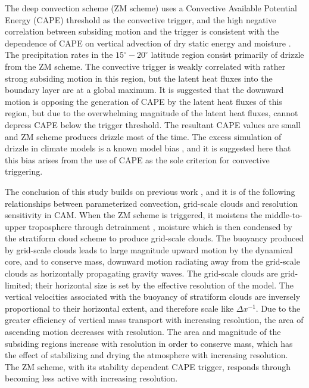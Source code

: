 The \cite{ZM1995AO} deep convection scheme (ZM scheme) uses a Convective Available Potential Energy (CAPE) threshold as the convective trigger, and the high negative correlation between subsiding motion and the trigger is consistent with the dependence of CAPE on vertical advection of dry static energy and moisture \citep{Z2002JGR}. The precipitation rates in the $15^{\circ} - 20^{\circ}$ latitude region consist primarily of drizzle from the ZM scheme. The convective trigger is weakly correlated with rather strong subsiding motion in this region, but the latent heat fluxes into the boundary layer are at a global maximum. It is suggested that the downward motion is opposing the generation of CAPE by the latent heat fluxes of this region, but due to the overwhelming magnitude of the latent heat fluxes, cannot depress CAPE below the trigger threshold. The resultant CAPE values are small and ZM scheme produces drizzle most of the time. The excess simulation of drizzle in climate models is a known model bias \citep{D2006JCLIM}, and it is suggested here that this bias arises from the use of CAPE as the sole criterion for convective triggering.

The conclusion of this study builds on previous work \citep[][Chapter~\ref{sec:chapter5}]{HR2017JCLIM,HR2018JAMES}, and it is of the following relationships between parameterized convection, grid-scale clouds and resolution sensitivity in CAM. When the ZM scheme is triggered, it moistens the middle-to-upper troposphere through detrainment \citep{ZM1995AO}, moisture which is then condensed by the stratiform cloud scheme to produce grid-scale clouds. The buoyancy produced by grid-scale clouds leads to large magnitude upward motion by the dynamical core, and to conserve mass, downward motion radiating away from the grid-scale clouds as horizontally propagating gravity waves. The grid-scale clouds are grid-limited; their horizontal size is set by the effective resolution of the model. The vertical velocities associated with the buoyancy of stratiform clouds are inversely proportional to their horizontal extent, and therefore scale like $\Delta x^{-1}$. Due to the greater efficiency of vertical mass transport with increasing resolution, the area of ascending motion decreases with resolution. The area and magnitude of the subsiding regions increase with resolution in order to conserve mass, which has the effect of stabilizing and drying the atmosphere with increasing resolution. The ZM scheme, with its stability dependent CAPE trigger, responds through becoming less active with increasing resolution.

